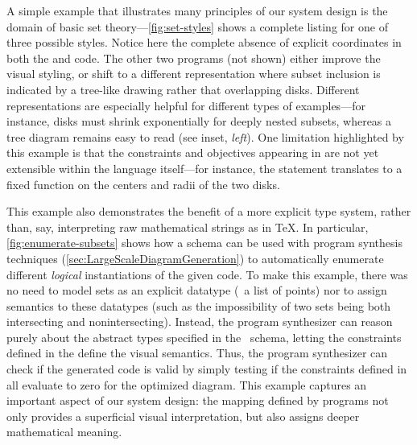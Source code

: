 A simple example that illustrates many principles of our system design is the domain of basic set theory---\cref{fig:set-styles} shows a complete listing for one of three possible styles.  Notice here the complete absence of explicit coordinates in both the \Substance{} and \Style{} code.  The other two \Style{} programs (not shown) either improve the visual styling, or shift to a different representation where subset inclusion is indicated by a tree-like drawing rather that overlapping disks.  Different representations are especially helpful for different types of examples---for instance, disks must shrink exponentially for deeply nested subsets, whereas a tree diagram remains easy to read (see inset, \textit{left}). One limitation highlighted by this example is that the constraints and objectives appearing in \Style{} are not yet extensible within the language itself---for instance, the statement  translates to a fixed function on the centers and radii of the two disks.

This example also demonstrates the benefit of a more explicit type system, rather than, say, interpreting raw mathematical strings as in \TeX.  In particular, \cref{fig:enumerate-subsets} shows how a \Domain{} schema can be used with program synthesis techniques (\cref{sec:LargeScaleDiagramGeneration}) to automatically enumerate different \emph{logical} instantiations of the given \Substance{} code.  To make this example, there was no need to model sets as an explicit datatype (\eg\ a list of points) nor to assign semantics to these datatypes (such as the impossibility of two sets being both intersecting and nonintersecting). Instead, the program synthesizer can reason purely about the abstract types specified in the \Domain\ schema, letting the constraints defined in the \Style{} define the visual semantics. Thus, the program synthesizer can check if the generated code is valid by simply testing if the constraints defined in \Style{} all evaluate to zero for the optimized diagram.  This example captures an important aspect of our system design: the mapping defined by \Style{} programs not only provides a superficial visual interpretation, but also assigns deeper mathematical meaning.

